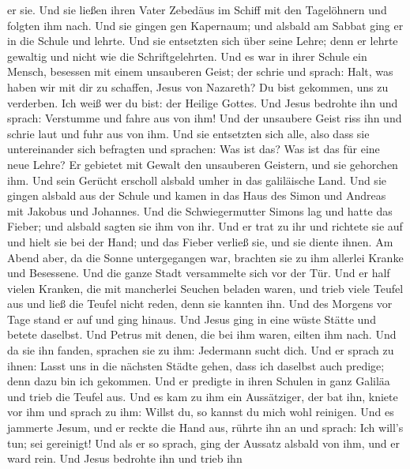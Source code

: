 er sie.  Und sie ließen ihren Vater Zebedäus im Schiff mit
den Tagelöhnern und folgten ihm nach.  Und sie gingen gen
Kapernaum; und alsbald am Sabbat ging er in die Schule und lehrte.
 Und sie entsetzten sich über seine Lehre; denn er lehrte
gewaltig und nicht wie die Schriftgelehrten.  Und es war in
ihrer Schule ein Mensch, besessen mit einem unsauberen Geist; der schrie
 und sprach: Halt, was haben wir mit dir zu schaffen, Jesus
von Nazareth? Du bist gekommen, uns zu verderben. Ich weiß wer du bist:
der Heilige Gottes.  Und Jesus bedrohte ihn und sprach:
Verstumme und fahre aus von ihm!  Und der unsaubere Geist
riss ihn und schrie laut und fuhr aus von ihm.  Und sie
entsetzten sich alle, also dass sie untereinander sich befragten und
sprachen: Was ist das? Was ist das für eine neue Lehre? Er gebietet mit
Gewalt den unsauberen Geistern, und sie gehorchen ihm.  Und
sein Gerücht erscholl alsbald umher in das galiläische Land.
 Und sie gingen alsbald aus der Schule und kamen in das
Haus des Simon und Andreas mit Jakobus und Johannes.  Und
die Schwiegermutter Simons lag und hatte das Fieber; und alsbald sagten
sie ihm von ihr.  Und er trat zu ihr und richtete sie auf
und hielt sie bei der Hand; und das Fieber verließ sie, und sie diente
ihnen.  Am Abend aber, da die Sonne untergegangen war,
brachten sie zu ihm allerlei Kranke und Besessene.  Und die
ganze Stadt versammelte sich vor der Tür.  Und er half
vielen Kranken, die mit mancherlei Seuchen beladen waren, und trieb
viele Teufel aus und ließ die Teufel nicht reden, denn sie kannten ihn.
 Und des Morgens vor Tage stand er auf und ging hinaus. Und
Jesus ging in eine wüste Stätte und betete daselbst.  Und
Petrus mit denen, die bei ihm waren, eilten ihm nach.  Und
da sie ihn fanden, sprachen sie zu ihm: Jedermann sucht dich.
 Und er sprach zu ihnen: Lasst uns in die nächsten Städte
gehen, dass ich daselbst auch predige; denn dazu bin ich gekommen.
 Und er predigte in ihren Schulen in ganz Galiläa und trieb
die Teufel aus.  Und es kam zu ihm ein Aussätziger, der bat
ihn, kniete vor ihm und sprach zu ihm: Willst du, so kannst du mich wohl
reinigen.  Und es jammerte Jesum, und er reckte die Hand
aus, rührte ihn an und sprach: Ich will's tun; sei gereinigt!
 Und als er so sprach, ging der Aussatz alsbald von ihm,
und er ward rein.  Und Jesus bedrohte ihn und trieb ihn
